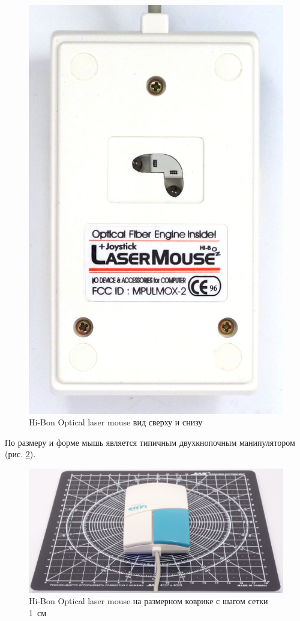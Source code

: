 \documentclass[11pt, a4paper]{article}
\begin{document}
\begin{figure}[h]
    \includegraphics[scale=0.4]{1996_hi-bon_laser_mouse/bottom_60.jpg}
    \caption{Hi-Bon Optical laser mouse вид сверху и снизу}
    \label{fig:OpticalLaserMouseTopBottom}
\end{figure}

По размеру и форме мышь является типичным двухкнопочным манипулятором (рис. \ref{fig:OpticalLaserMouseSize}).

\begin{figure}[h]
    \centering
    \includegraphics[scale=0.3]{1996_hi-bon_laser_mouse/size.jpg}
    \caption{Hi-Bon Optical laser mouse на размерном коврике с шагом сетки 1~см}
    \label{fig:OpticalLaserMouseSize}
\end{figure}
\end{document}
